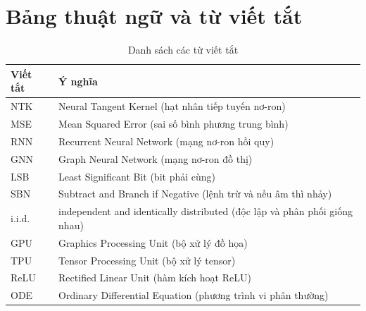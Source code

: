 \chapter*{Bảng thuật ngữ và từ viết tắt}

\begin{table}[ht]
\centering
\caption{Danh sách các từ viết tắt}
\label{tab:abbreviations}
\renewcommand{\arraystretch}{1.2}
\begin{tabular}{|p{}|p{}|}
\hline
	\textbf{Viết tắt} & \textbf{Ý nghĩa} \\
\hline
NTK & Neural Tangent Kernel (hạt nhân tiếp tuyến nơ-ron) \\
\hline
MSE & Mean Squared Error (sai số bình phương trung bình) \\
\hline
RNN & Recurrent Neural Network (mạng nơ-ron hồi quy) \\
\hline
GNN & Graph Neural Network (mạng nơ-ron đồ thị) \\
\hline
LSB & Least Significant Bit (bit phải cùng) \\
\hline
SBN & Subtract and Branch if Negative (lệnh trừ và nếu âm thì nhảy) \\
\hline
i.i.d. & independent and identically distributed (độc lập và phân phối giống nhau) \\
\hline
GPU & Graphics Processing Unit (bộ xử lý đồ họa) \\
\hline
TPU & Tensor Processing Unit (bộ xử lý tensor) \\
\hline
ReLU & Rectified Linear Unit (hàm kích hoạt ReLU) \\
\hline
ODE & Ordinary Differential Equation (phương trình vi phân thường) \\
\hline
\end{tabular}
\end{table}

